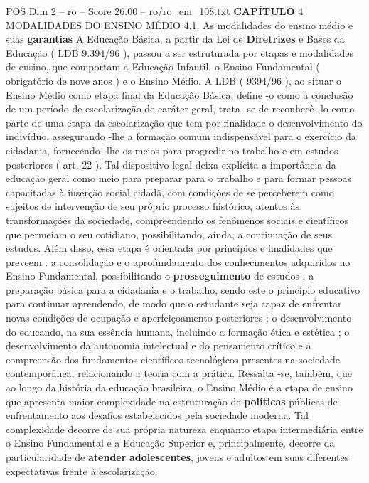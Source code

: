 \begin{textsample}{POS Dim 2 – ro – Score 26.00 – ro/ro\_em\_108.txt}  \label{ex:f2_pos_187}
\textbf{CAPÍTULO} 4 MODALIDADES DO ENSINO MÉDIO 4.1.
As modalidades do ensino médio e suas \textbf{garantias} A Educação Básica, a partir da Lei de \textbf{Diretrizes} e Bases da Educação ( LDB 9.394/96 ), passou a ser estruturada por etapas e modalidades de ensino, que comportam a Educação Infantil, o Ensino Fundamental ( obrigatório de nove anos ) e o Ensino Médio.
A LDB ( 9394/96 ), ao situar o Ensino Médio como etapa final da Educação Básica, define -o como a conclusão de um período de escolarização de caráter geral, trata -se de reconhecê -lo como parte de uma etapa da escolarização que tem por finalidade o desenvolvimento do indivíduo, assegurando -lhe a formação comum indispensável para o exercício da cidadania, fornecendo -lhe os meios para progredir no trabalho e em estudos posteriores ( art. 22 ).
Tal dispositivo legal deixa explícita a importância da educação geral como meio para preparar para o trabalho e para formar pessoas capacitadas à inserção social cidadã, com condições de se perceberem como sujeitos de intervenção de seu próprio processo histórico, atentos às transformações da sociedade, compreendendo os fenômenos sociais e científicos que permeiam o seu cotidiano, possibilitando, ainda, a continuação de seus estudos.
Além disso, essa etapa é orientada por princípios e finalidades que preveem : a consolidação e o aprofundamento dos conhecimentos adquiridos no Ensino Fundamental, possibilitando o \textbf{prosseguimento} de estudos ; a preparação básica para a cidadania e o trabalho, sendo este o princípio educativo para continuar aprendendo, de modo que o estudante seja capaz de enfrentar novas condições de ocupação e aperfeiçoamento posteriores ; o desenvolvimento do educando, na sua essência humana, incluindo a formação ética e estética ; o desenvolvimento da autonomia intelectual e do pensamento crítico e a compreensão dos fundamentos científicos tecnológicos presentes na sociedade contemporânea, relacionando a teoria com a prática.
Ressalta -se, também, que ao longo da história da educação brasileira, o Ensino Médio é a etapa de ensino que apresenta maior complexidade na estruturação de \textbf{políticas} públicas de enfrentamento aos desafios estabelecidos pela sociedade moderna.
Tal complexidade decorre de sua própria natureza enquanto etapa intermediária entre o Ensino Fundamental e a Educação Superior e, principalmente, decorre da particularidade de \textbf{atender} \textbf{adolescentes}, jovens e adultos em suas diferentes expectativas frente à escolarização.

\end{textsample}
